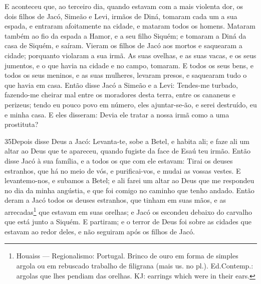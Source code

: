 E aconteceu que, ao terceiro dia, quando estavam com a mais
violenta dor, os dois filhos de Jacó, Simeão e Levi, irmãos de Diná,
tomaram cada um a sua espada, e entraram afoitamente na cidade, e
mataram todos os homens. Mataram também ao fio da espada a
Hamor, e a seu filho Siquém; e tomaram a Diná da casa de Siquém, e
saíram. Vieram os filhos de Jacó aos mortos e saquearam a
cidade; porquanto violaram a sua irmã. As suas ovelhas, e as
suas vacas, e os seus jumentos, e o que havia na cidade e no campo,
tomaram. E todos os seus bens, e todos os seus meninos, e as
suas mulheres, levaram presos, e saquearam tudo o que havia em casa.
Então disse Jacó a Simeão e a Levi: Tendes-me turbado,
fazendo-me cheirar mal entre os moradores desta terra, entre os
cananeus e perizeus; tendo eu pouco povo em número, eles
ajuntar-se-ão, e serei destruído, eu e minha casa. E eles
disseram: Devia ele tratar a nossa irmã como a uma prostituta?

\smallskip

\lettrine{35} Depois disse Deus a Jacó: Levanta-te, sobe a
Betel, e habita ali; e faze ali um altar ao Deus que te apareceu,
quando fugiste da face de Esaú teu irmão. Então disse Jacó à sua
família, e a todos os que com ele estavam: Tirai os deuses
estranhos, que há no meio de vós, e purificai-vos, e mudai as vossas
vestes. E levantemo-nos, e subamos a Betel; e ali farei um altar
ao Deus que me respondeu no dia da minha angústia, e que foi comigo
no caminho que tenho andado. Então deram a Jacó todos os deuses
estranhos, que tinham em suas mãos, e as arrecadas\footnote{Houaiss
--- Regionalismo: Portugal. Brinco de ouro em forma de simples
argola ou em rebuscado trabalho de filigrana (mais us. no pl.).
Ed.Contemp.: argolas que lhes pendiam das orelhas. KJ: earrings
which were in their ears.} que estavam em suas orelhas; e Jacó os
escondeu debaixo do carvalho que está junto a Siquém. E
partiram; e o terror de Deus foi sobre as cidades que estavam ao
redor deles, e não seguiram após os filhos de Jacó.

